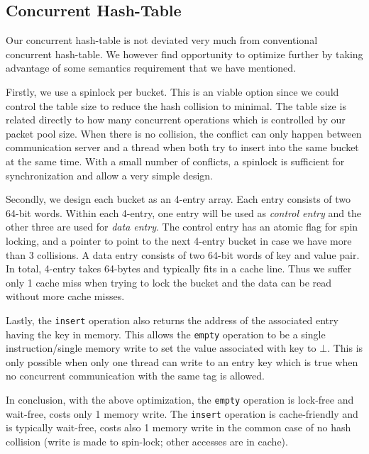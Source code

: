 \subsection{Concurrent Hash-Table}
Our concurrent hash-table is not deviated very much from conventional
concurrent hash-table. We however find opportunity to optimize further by taking 
advantage of some semantics requirement that we have mentioned.

Firstly, we use a spinlock per bucket. This is an viable option since we could
control the table size to reduce the hash collision to minimal. The table size is
related directly to how many concurrent operations which is controlled by 
our packet pool size. When there is no collision, the conflict can only happen
between communication server and a thread when both try to insert into the same
bucket at the same time. With a small number of conflicts, a spinlock is
sufficient for synchronization and allow a very simple design.

Secondly, we design each bucket as an 4-entry array. Each entry consists of two
64-bit words. Within each 4-entry, one entry will be used as \textit{control
entry} and the other three are used for \textit{data entry}. The control entry
has an atomic flag for spin locking, and a pointer to point to the next 4-entry
bucket in case we have more than 3 collisions. A data entry consists of two
64-bit words of key and value pair. In total, 4-entry takes 64-bytes and
typically fits in a cache line. Thus we suffer only 1 cache miss when trying to
lock the bucket and the data can be read without more cache misses.

Lastly, the \texttt{insert} operation also returns the address of the
associated entry having the key in memory. This allows the \texttt{empty}
operation to be a single instruction/single memory write to set the value
associated with key to $\bot$. This is only possible when only one thread can
write to an entry key which is true when no concurrent communication with the
same tag is allowed.

In conclusion, with the above optimization, the \texttt{empty} operation is
lock-free and wait-free, costs only 1 memory write. The \texttt{insert}
operation is cache-friendly and is typically wait-free, costs also 1 memory
write in the common case of no hash collision (write is made to spin-lock;
other accesses are in cache).

